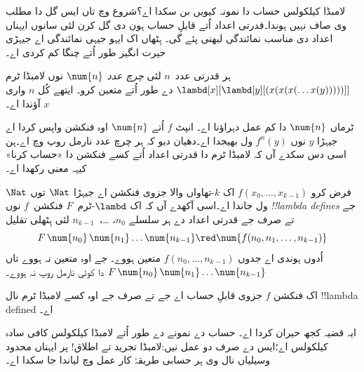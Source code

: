 \documentclass[../../../include/open-logic-section]{subfiles}
\begin{document}

لامبڈا کیلکولس حساب دا نمونہ کیویں بن سکدا اے؟شروع وچ تاں
ایس گل دا مطلب وی صاف نہیں ہوندا۔قدرتی اعداد اُتے قابلِ حساب ہون
دی گل کرن لئی سانوں ایہناں اعداد دی مناسب نمائندگی لبھنی
پئے گی۔ ہِٹھاں اک ایہو جیہی نمائندگی اے جیہڑی حیرت انگیز
طور اُتے چنگا کم کردی اے۔

\begin{defn}
ہر قدرتی عدد~$n$ لئی \emph{چرچ عدد} $\num{n}$ نوں لامبڈا
ٹرم $\lambd[x][\lambd[y][(x(x(x(\dots
x(y)))))]]$ دے طور اُتے متعین کرو۔ ایتھے کُل $n$ واری $x$ آؤندا اے۔
\end{defn}

ٹرماں $\num{n}$ دا کم عمل دہراؤنا اے۔ انپٹ $f$ اُتے
$\num{n}$ اوہ فنکشن واپس کردا اے جیہڑا $y$ نوں $f^n(y)$
ول بھیجدا اے۔دھیان دیو کہ ہر چرچ عدد نارمل روپ وچ اے۔ہن
اسی دس سکدے آں کہ لامبڈا ٹرم دا قدرتی اعداد اُتے کسے
فنکشن دا «حساب کرنا» کیہہ معنی رکھدا اے۔

\begin{defn}
فرض کرو $f(x_0, \dots, x_{k-1})$ اک $k$-تھاواں والا جزوی
فنکشن اے جیہڑا $\Nat$ توں $\Nat$ ول جاندا اے۔اسی آکھدے آں کہ اک
$\lambd$-ٹرم~$F$ فنکشن~$f$ نوں \emph{!!{lambda define}s}
جے تے صرف جے قدرتی اعداد دے ہر سلسلے $n_0$،
\dots،~$n_{k-1}$ لئی ہِٹھلی تقلیل
\[
F\, \num{n_0}\, \num{n_1} \dots \num{n_{k-1}} \red \num{f(n_0, n_1, \dots,
  n_{k-1})}
\]
اُدوں ہوندی اے جدوں $f(n_0, \dots, n_{k-1})$
متعین ہووے۔ جے اوہ متعین نہ ہووے تاں
$F\, \num{n_0}\, \num{n_1} \dots \num{n_{k-1}}$
دا کوئی نارمل روپ نہ ہووے۔
\end{defn}

\begin{thm}
اک فنکشن $f$ جزوی قابلِ حساب اے جے تے صرف جے اوہ کسے
لامبڈا ٹرم نال !!{lambda defined} اے۔
\end{thm}

\begin{explain}
ایہ قضیہ کجھ حیران کردا اے۔ حساب دے نمونے دے طور اُتے
لامبڈا کیلکولس کافی سادہ کیلکولس اے؛ایس دے صرف دو عمل
نیں:لامبڈا تجرید تے اطلاق!{} پر ایہناں محدود وسیلیاں
نال وی ہر حسابی طریقۂ کار عمل وچ لیاندا جا سکدا اے۔
\end{explain}
\end{document}
